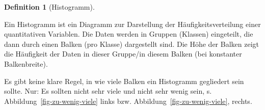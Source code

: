 \documentclass[
  letterpaper,
]{scrbook}
\theoremstyle{definition}
\theoremstyle{definition}
\newtheorem{definition}{Definition}[chapter]
\theoremstyle{definition}
\theoremstyle{remark}
\begin{document}
\begin{definition}[Histogramm]\protect\hypertarget{def-histogramm}{}\label{def-histogramm}

Ein Histogramm ist ein Diagramm zur Darstellung der
Häufigkeitsverteilung einer quantitativen Variablen. Die Daten werden in
Gruppen (Klassen) eingeteilt, die dann durch einen Balken (pro Klasse)
dargestellt sind. Die Höhe der Balken zeigt die Häufigkeit der Daten in
dieser Gruppe/in diesem Balken (bei konstanter Balkenbreite).

\end{definition}

Es gibt keine klare Regel, in wie viele Balken ein Histogramm gegliedert
sein sollte. Nur: Es sollten nicht sehr viele und nicht sehr wenig sein,
s. Abbildung~\ref{fig-zu-wenig-viele} links bzw.
Abbildung~\ref{fig-zu-wenig-viele}, rechts.
\end{document}
